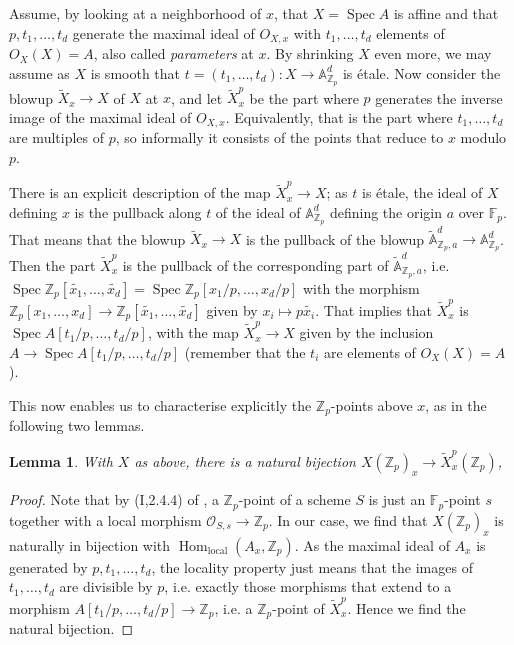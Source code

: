 \documentclass[12pt]{article}
\newcommand{\A}{\mathbb{A}}
\newcommand{\Z}{\mathbb{Z}}
\renewcommand{\O}{\mathcal{O}}
\newcommand{\F}{\mathbb{F}}
\DeclareMathOperator{\Hom}{Hom}
\DeclareMathOperator{\Spec}{Spec}
\theoremstyle{plain}
\newtheorem{lem}[thm]{Lemma} %
\theoremstyle{definition}
\theoremstyle{remark}
\begin{document}
Assume, by looking at a neighborhood of $x$, that $X = \Spec A$ is affine and that $p,t_1,\dots,t_d$ generate the maximal ideal of $O_{X,x}$ with $t_1,\dots,t_d$ elements of $O_X(X) = A$, also called \textit{parameters} at $x$. By shrinking $X$ even more, we may assume as $X$ is smooth that $t = (t_1,\dots,t_d): X \to \A^d_{\Z_p}$ is \'etale. Now consider the blowup $\widetilde{X}_x \to X$ of $X$ at $x$, and let $\widetilde{X}_x^p$ be the part where $p$ generates the inverse image of the maximal ideal of $O_{X,x}$. Equivalently, that is the part where $t_1,\dots,t_d$ are multiples of $p$, so informally it consists of the points that reduce to $x$ modulo $p$.

There is an explicit description of the map $\widetilde{X}_x^p \to X$; as $t$ is \'etale, the ideal of $X$ defining $x$ is the pullback along $t$ of the ideal of $\A^d_{\Z_p}$ defining the origin $a$ over $\F_p$. That means that the blowup $\widetilde{X}_x \to X$ is the pullback of the blowup $\widetilde{\A}^d_{\Z_p,a} \to \A_{\Z_p}^d$. Then the part $\widetilde{X}_x^p$ is the pullback of the corresponding part of $\widetilde{\A}^d_{\Z_p,a}$, i.e. $\Spec \Z_p[\widetilde{x_1},\dots,\widetilde{x_d}] = \Spec \Z_p[x_1/p,\dots,x_d/p]$ with the morphism $\Z_p[x_1,\dots,x_d] \to \Z_p[\widetilde{x_1},\dots,\widetilde{x_d}]$ given by $x_i \mapsto p\widetilde{x_i}$. That implies that $\widetilde{X}_x^p$ is $\Spec A[t_1/p,\dots,t_d/p]$, with the map $\widetilde{X}_x^p \to X$ given by the inclusion $A \to \Spec A[t_1/p,\dots,t_d/p]$ (remember that the $t_i$ are elements of $O_X(X) = A$).

This now enables us to characterise explicitly the $\Z_p$-points above $x$, as in the following two lemmas.

\begin{lem}
With $X$ as above, there is a natural bijection $X(\Z_p)_x \to \widetilde{X}_x^p(\Z_p)$,
\end{lem}
\begin{proof}
Note that by (I,2.4.4) of \cite{ega}, a $\Z_p$-point of a scheme $S$ is just an $\F_p$-point $s$ together with a local morphism $\O_{S,s} \to \Z_p$. In our case, we find that $X(\Z_p)_x$ is naturally in bijection with $\Hom_{\text{local}}(A_x,\Z_p)$. As the maximal ideal of $A_x$ is generated by $p,t_1,\dots,t_d$, the locality property just means that the images of $t_1,\dots,t_d$ are divisible by $p$, i.e. exactly those morphisms that extend to a morphism $A[t_1/p,\dots,t_d/p] \to \Z_p$, i.e. a $\Z_p$-point of $\widetilde{X}_x^p$. Hence we find the natural bijection.
\end{proof}
\end{document}
